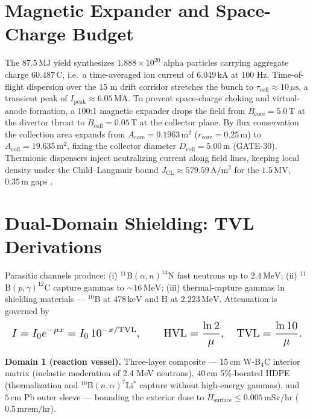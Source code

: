 \documentclass[10pt,journal,compsoc]{IEEEtran}
\newcommand{\MeV}{\,\mathrm{MeV}}
\newcommand{\keV}{\,\mathrm{keV}}
\newcommand{\kA}{\,\mathrm{kA}}
\newcommand{\MA}{\,\mathrm{MA}}
\newcommand{\cm}{\,\mathrm{cm}}
\newcommand{\m}{\,\mathrm{m}}
\newcommand{\T}{\,\mathrm{T}}
\newcommand{\MJ}{\,\mathrm{MJ}}
\newcommand{\mus}{\,\mu\mathrm{s}}
\begin{document}
\section{Magnetic Expander and Space-Charge Budget}
The $87.5\MJ$ yield synthesizes $1.888\times10^{20}$ alpha particles
carrying aggregate charge $60.487\,\mathrm{C}$, i.e.\ a time-averaged ion
current of $6.049\kA$ at 100 Hz. Time-of-flight dispersion over the 15 m
drift corridor stretches the bunch to $\tau_{\mathrm{coll}}\approx10\mus$,
a transient peak of $I_{\mathrm{peak}}\approx6.05\MA$. To prevent
space-charge choking and virtual-anode formation, a 100:1 magnetic
expander drops the field from $B_{\mathrm{core}}=5.0\T$ at the divertor
throat to $B_{\mathrm{coll}}=0.05\T$ at the collector plane. By flux
conservation the collection area expands from
$A_{\mathrm{core}}=0.1963\,\mathrm{m^2}$ ($r_{\mathrm{core}}=0.25\m$) to
$A_{\mathrm{coll}}=19.635\,\mathrm{m^2}$, fixing the collector diameter
$D_{\mathrm{coll}}=5.00\m$ (GATE-30). Thermionic dispensers inject
neutralizing current along field lines, keeping local density under the
Child--Langmuir bound $J_{\mathrm{CL}}\approx579.59\,\mathrm{A/m^2}$ for
the $1.5\,\mathrm{MV}$, $0.35\m$ gaps \cite{childlangmuir,fowler2017}.

\section{Dual-Domain Shielding: TVL Derivations}
Parasitic channels produce: (i) $^{11}$B$(\alpha,n)^{14}$N fast neutrons
up to $2.4\MeV$; (ii) $^{11}$B$(p,\gamma)^{12}$C capture gammas to
$\sim16\MeV$; (iii) thermal-capture gammas in shielding materials ---
$^{10}$B at $478\keV$ and H at $2.223\MeV$. Attenuation is governed by
\begin{equation}\resizebox{\columnwidth}{!}{$\displaystyle
I = I_0 e^{-\mu x} = I_0\,10^{-x/\mathrm{TVL}},\qquad
\mathrm{HVL} = \frac{\ln 2}{\mu},\quad
\mathrm{TVL} = \frac{\ln 10}{\mu}.
$}\end{equation}

\textbf{Domain 1 (reaction vessel).} Three-layer composite ---
$15\cm$ W-B$_4$C interior matrix (inelastic moderation of 2.4 MeV
neutrons), $40\cm$ 5\%-borated HDPE (thermalization and
$^{10}$B$(n,\alpha)^7$Li$^*$ capture without high-energy gammas), and
$5\cm$ Pb outer sleeve --- bounding the exterior dose to
$\dot{H}_{\mathrm{surface}} \le 0.005\,\mathrm{mSv/hr}$
($0.5\,\mathrm{mrem/hr}$).
\end{document}
